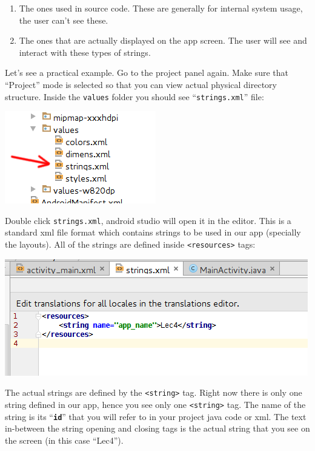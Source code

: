 \begin{enumerate}
	\item The ones used in source code. These are generally for internal system usage, the user can't see these.
	\item The ones that are actually displayed on the app screen. The user will see and interact with these types of strings.
\end{enumerate}

Let's see a practical example. Go to the project panel again. Make sure that ``Project'' mode is selected so that you can view actual physical directory structure. Inside the \texttt{values} folder you should see ``\texttt{strings.xml}'' file:

\begin{center}
	\includegraphics[scale=0.4]{chapters/ch04/images/3_strings}
\end{center}

Double click \texttt{strings.xml}, android studio will open it in the editor. This is a standard xml file format which contains strings to be used in our app (specially the layouts). All of the strings are defined inside \texttt{<resources>} tags:

\begin{center}
	\includegraphics[scale=0.4]{chapters/ch04/images/4_strings_xml}
\end{center}

The actual strings are defined by the \texttt{<string>} tag. Right now there is only one string defined in our app, hence you see only one \texttt{<string>} tag. The name of the string is its ``\textbf{\texttt{id}}'' that you will refer to in your project java code or xml. The text in-between the string opening and closing tags is the actual string that you see on the screen (in this case ``Lec4'').

